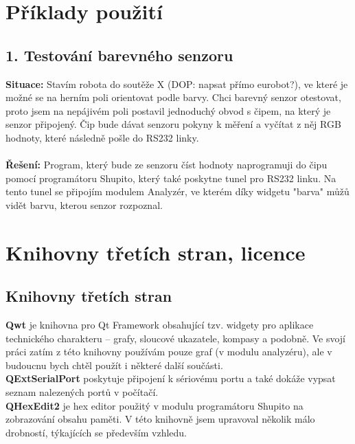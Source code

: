 \documentclass[12pt, a4paper, oneside]{article}
\begin{document}
\newpage
\section*{Příklady použití}
\subsection*{1. Testování barevného senzoru}
{\bf Situace:} Stavím robota do soutěže X (DOP: napsat přímo eurobot?), ve které je možné se na herním poli orientovat podle barvy. Chci barevný senzor otestovat, proto jsem na nepájivém poli postavil jednoduchý obvod s čipem, na který je senzor připojený. Čip bude dávat senzoru pokyny k měření a vyčítat z něj RGB hodnoty, které následně pošle do RS232 linky.\\
\\
{\bf Řešení:} Program, který bude ze senzoru číst hodnoty naprogramuji do čipu pomocí programátoru Shupito, který také poskytne tunel pro RS232 linku. Na tento tunel se připojím modulem Analyzér, ve kterém díky widgetu "barva" můžů vidět barvu, kterou senzor rozpoznal.

\newpage
\setlength{\voffset}{0mm} %
\pagestyle{plain}

\section*{Knihovny třetích stran, licence}
\subsection*{Knihovny třetích stran}
{\bf Qwt}\cite{qwt_link} je knihovna pro Qt Framework obsahující tzv. widgety pro aplikace technického charakteru -- grafy, sloucové ukazatele, kompasy a podobně. Ve svojí práci
zatím z této knihovny používám pouze graf (v modulu analyzéru), ale v budoucnu bych chtěl použít i některé další součásti. \\
{\bf QExtSerialPort}\cite{qext_link} poskytuje připojení k sériovému portu a také dokáže vypsat seznam nalezených portů v počítačí.\\
{\bf QHexEdit2}\cite{qhex_link} je hex editor použitý v modulu programátoru Shupito na zobrazování obsahu paměti. V této knihovně jsem upravoval několik málo drobností, 
týkajících se především vzhledu.
\end{document}
